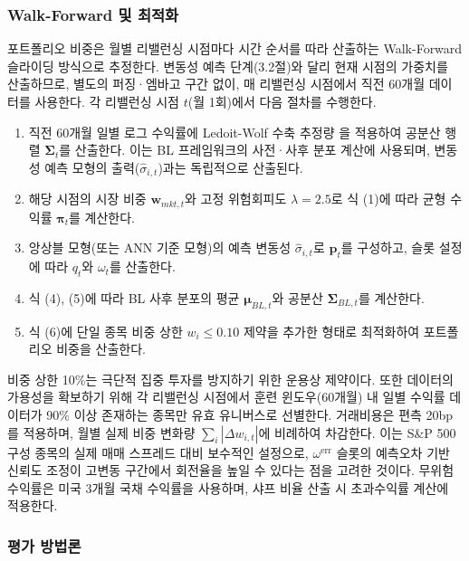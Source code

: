 \documentclass{article}
\begin{document}
\subsubsection{Walk-Forward 및 최적화}
\label{subsubsec:bl_walkforward}

포트폴리오 비중은 월별 리밸런싱 시점마다 시간 순서를 따라 산출하는 Walk-Forward 슬라이딩 방식으로 추정한다. 변동성 예측 단계(3.2절)와 달리 현재 시점의 가중치를 산출하므로, 별도의 퍼징·엠바고 구간 없이, 매 리밸런싱 시점에서 직전 60개월 데이터를 사용한다. 각 리밸런싱 시점 $t$(월 1회)에서 다음 절차를 수행한다.

\begin{enumerate}
  \item 직전 60개월 일별 로그 수익률에 Ledoit-Wolf 수축 추정량 \citep{ledoitwolf2004}을 적용하여 공분산 행렬 $\boldsymbol{\Sigma}_t$를 산출한다. 이는 BL 프레임워크의 사전·사후 분포 계산에 사용되며, 변동성 예측 모형의 출력($\hat{\sigma}_{i,t}$)과는 독립적으로 산출된다.
  \item 해당 시점의 시장 비중 $\mathbf{w}_{mkt,t}$와 고정 위험회피도 $\lambda = 2.5$로 식 (1)에 따라 균형 수익률 $\boldsymbol{\pi}_t$를 계산한다.
  \item 앙상블 모형(또는 ANN 기준 모형)의 예측 변동성 $\hat{\sigma}_{i,t}$로 $\mathbf{p}_t$를 구성하고, 슬롯 설정에 따라 $q_t$와 $\omega_t$를 산출한다.
  \item 식 (4), (5)에 따라 BL 사후 분포의 평균 $\boldsymbol{\mu}_{BL,t}$와 공분산 $\boldsymbol{\Sigma}_{BL,t}$를 계산한다.
  \item 식 (6)에 단일 종목 비중 상한 $w_i \leq 0.10$ 제약을 추가한 형태로 최적화하여 포트폴리오 비중을 산출한다.
\end{enumerate}

비중 상한 10\%는 극단적 집중 투자를 방지하기 위한 운용상 제약이다. 또한 데이터의 가용성을 확보하기 위해 각 리밸런싱 시점에서 훈련 윈도우(60개월) 내 일별 수익률 데이터가 90\% 이상 존재하는 종목만 유효 유니버스로 선별한다. 거래비용은 편측 20bp를 적용하며, 월별 실제 비중 변화량 $\sum_i |\Delta w_{i,t}|$에 비례하여 차감한다. 이는 S\&P 500 구성 종목의 실제 매매 스프레드 대비 보수적인 설정으로, $\omega^{\mathrm{err}}$ 슬롯의 예측오차 기반 신뢰도 조정이 고변동 구간에서 회전율을 높일 수 있다는 점을 고려한 것이다. 무위험 수익률은 미국 3개월 국채 수익률을 사용하며, 샤프 비율 산출 시 초과수익률 계산에 적용한다.

\subsubsection{평가 방법론}
\label{subsubsec:bl_eval}
\end{document}
